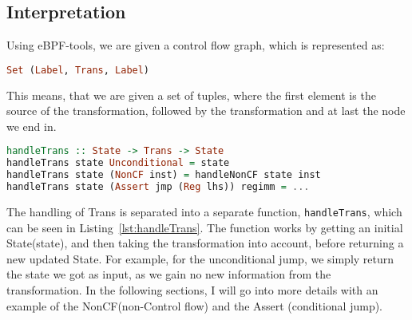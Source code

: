 \subsection{Interpretation}
Using eBPF-tools, we are given a control flow graph, which is represented as:
\begin{lstlisting}[language={haskell}, numbers=none]
  Set (Label, Trans, Label)
\end{lstlisting}
This means, that we are given a set of tuples, where the first element is the
source of the transformation, followed by the transformation and at last the
node we end in. 
\begin{lstlisting}[language={haskell}, caption={The handleTrans functnion}, label={lst:handleTrans}]
handleTrans :: State -> Trans -> State
handleTrans state Unconditional = state
handleTrans state (NonCF inst) = handleNonCF state inst
handleTrans state (Assert jmp (Reg lhs)) regimm = ...
\end{lstlisting}
The handling of Trans is separated into a separate function,
\texttt{handleTrans}, which can be seen in Listing~\ref{lst:handleTrans}. The
function works by getting an initial State(state), and then taking the
transformation into account, before returning a new updated State. For example,
for the unconditional jump, we simply return the state we got as input, as we
gain no new information from the transformation. In the following sections, I
will go into more details with an example of the NonCF(non-Control flow) and
the Assert (conditional jump).


